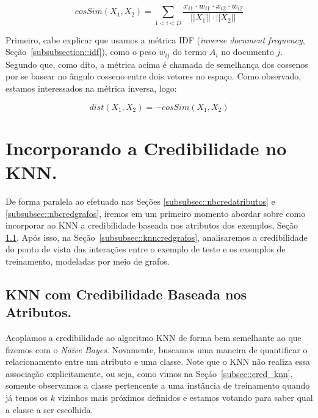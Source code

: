 \begin{itemize}
\begin{equation}\label{eqn::distancia_texto}
    cosSim(X_1, X_2) = \sum\limits_{1 < i < D} \frac{ x_{i1} \cdot w_{i1} \cdot x_{i2} \cdot w_{i2} }{ ||X_1|| \cdot ||X_2|| }
\end{equation}

Primeiro, cabe explicar que usamos a métrica \textsc{IDF} (\textit{inverse document frequency}, Seção~\ref{subsubsection::idf}), como o peso $w_{ij}$ do termo $A_i$ no documento $j$. Segundo que, como dito, a métrica acima é chamada de semelhança dos cossenos por se basear no ângulo cosseno entre dois vetores no espaço. Como observado, estamos interessados na métrica inversa, logo:
 
 \begin{equation}\label{eqn::distancia_texto}
    dist(X_1, X_2) = - cosSim(X_1, X_2)
\end{equation}


\end{itemize}

\section{Incorporando a Credibilidade no \textsc{KNN}.}
\label{subsubsec::knn_cred}

De forma paralela ao efetuado nas Seções \ref{subsubsec::nbcredatributos} e \ref{subsubsec::nbcredgrafos}, iremos em um primeiro momento abordar sobre como incorporar ao \textsc{KNN} a credibilidade baseada nos atributos dos exemplos, Seção \ref{subsubsec::knncredatributos}. Após isso, na Seção~\ref{subsubsec::knncredgrafos}, analisaremos a credibilidade do ponto de vista das interações entre o exemplo de teste e os exemplos de treinamento, modeladas por meio de grafos.

\subsection{\textsc{KNN} com Credibilidade Baseada nos Atributos.}
\label{subsubsec::knncredatributos}


Acoplamos a credibilidade ao algoritmo \textsc{KNN} de forma bem semelhante ao que fizemos com o \textit{Naïve Bayes}. 
Novamente, buscamos uma maneira de quantificar o relacionamento entre um atributo e uma classe. 
Note que o \textsc{KNN} não realiza essa associação explicitamente, ou seja, como vimos na Seção~\ref{subsec::cred_knn}, somente observamos a classe pertencente a uma instância de treinamento quando já temos os $k$ vizinhos mais próximos definidos e estamos votando para saber qual a classe a ser escolhida.

